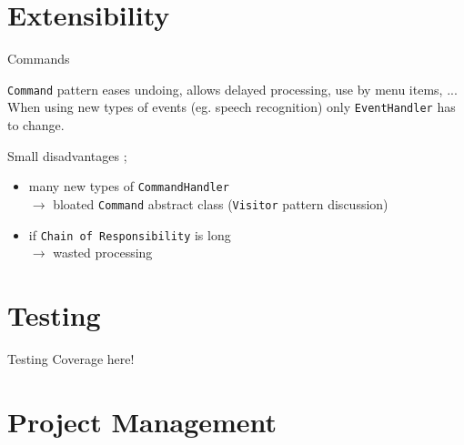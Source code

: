 \documentclass[10pt]{beamer}
\begin{document}
\section{Extensibility}

\begin{frame}[fragile]{Commands}
	\begin{center}
	\texttt{Command} pattern eases undoing, allows delayed processing, use by menu items, ... When using new types of events (eg. speech recognition) only \texttt{EventHandler} has to change.
	
	\vspace{0.5cm} Small disadvantages ; 
	\begin{itemize}
	\item many new types of \texttt{CommandHandler} 
	\\ $\rightarrow$ bloated \texttt{Command} abstract class (\texttt{Visitor} pattern discussion)
	\item if \texttt{Chain of Responsibility} is long
	\\ $\rightarrow$ wasted processing
	\end{itemize}
	\end{center}
\end{frame}

\begin{frame}[fragile]{}
	\begin{center}

	\end{center}
\end{frame}

\begin{frame}[fragile]{}
	\begin{center}
	
	\end{center}
\end{frame}

\section{Testing}

\begin{frame}[fragile]{Testing}
	Coverage here!
\end{frame}

\section{Project Management}
\end{document}
